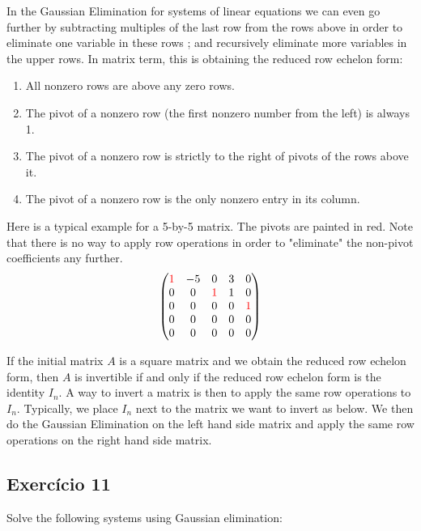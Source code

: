 In the Gaussian Elimination for systems of linear equations we can even
go further by subtracting multiples of the last row from the rows above
in order to eliminate one variable in these rows ; and recursively
eliminate more variables in the upper rows.
In matrix term, this is obtaining the reduced row echelon form:

\begin{enumerate}
  \item All nonzero rows are above any zero rows.
  \item The pivot of a nonzero row (the first nonzero number from the left)
    is always 1.
  \item The pivot of a nonzero row is strictly to the right of
    pivots of the rows above it.
  \item The pivot of a nonzero row is the only nonzero entry in its column.
\end{enumerate}

Here is a typical example for a 5-by-5 matrix. The pivots are painted
in red. Note that there is
no way to apply row operations in order to "eliminate" the non-pivot
coefficients any further.
    $$
    \begin{pmatrix}
    \color{red} 1 & -5 & 0 & 3 & 0 \\
    0 & 0  & \color{red} 1 & 1 & 0 \\
    0 & 0  & 0 & 0  & \color{red} 1 \\
    0 & 0 & 0  & 0 & 0 \\
    0 & 0 & 0  & 0 & 0
    \end{pmatrix}$$

If the initial matrix $A$ is a square matrix and we obtain the reduced row
echelon form, then $A$ is invertible if and only if
the reduced row echelon form is the identity $I_n$. A way to
invert a matrix is then to apply the same row operations to
$I_n$. Typically, we place $I_n$ next to
the matrix we want to invert as below. We then do the
Gaussian Elimination on the left hand side matrix and apply the same
row operations on the right hand side matrix.

\subsection*{Exercício 11}

Solve the following systems using Gaussian elimination:

